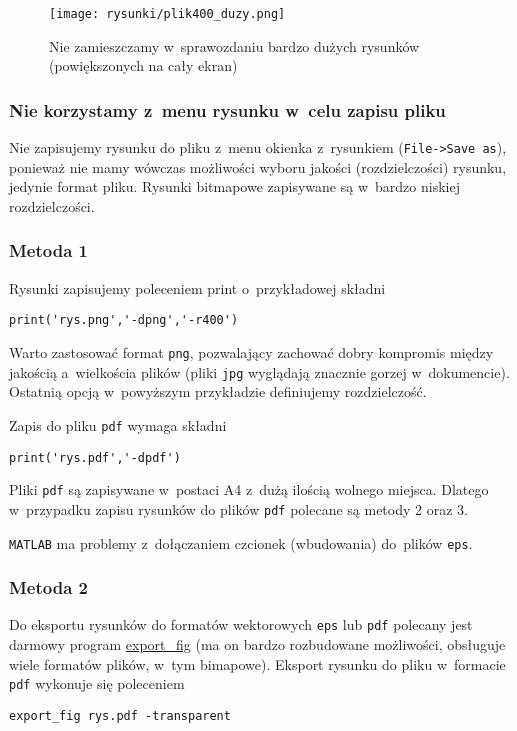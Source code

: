 \begin{figure}[H]
\centering
\texttt{[image: rysunki/plik400\_duzy.png]}
\caption{Nie zamieszczamy w~sprawozdaniu bardzo dużych rysunków (powiększonych na cały ekran)}
\label{r_plik400_duzy}
\end{figure}

\subsubsection{Nie korzystamy z~menu rysunku w~celu zapisu pliku}
Nie zapisujemy rysunku do pliku z~menu okienka z~rysunkiem (\texttt{File->Save as}), ponieważ nie mamy wówczas możliwości wyboru jakości (rozdzielczości) rysunku, jedynie format pliku. Rysunki bitmapowe zapisywane są w~bardzo niskiej rozdzielczości.

\subsubsection{Metoda 1}
Rysunki zapisujemy poleceniem print o~przykładowej składni
\begin{lstlisting}[style=custommatlab,frame=single]
print('rys.png','-dpng','-r400')
\end{lstlisting}
Warto zastosować format \texttt{png}, pozwalający zachować dobry kompromis między jakością a~wielkościa plików (pliki \texttt{jpg} wyglądają znacznie gorzej w~dokumencie). Ostatnią opcją w~powyższym przykładzie definiujemy rozdzielczość.

Zapis do pliku \texttt{pdf} wymaga składni
\begin{lstlisting}[style=custommatlab,frame=single]
print('rys.pdf','-dpdf')
\end{lstlisting}
Pliki \texttt{pdf} są zapisywane w~postaci A4 z~dużą ilością wolnego miejsca. Dlatego w~przypadku zapisu rysunków do plików \texttt{pdf} polecane są metody 2 oraz 3.

\texttt{MATLAB} ma problemy z~dołączaniem czcionek (wbudowania) do~plików \texttt{eps}.

\subsubsection{Metoda 2}
Do eksportu rysunków do formatów wektorowych \texttt{eps} lub \texttt{pdf} polecany jest darmowy program \url{export_fig} (ma on bardzo rozbudowane możliwości, obsługuje wiele formatów plików, w~tym bimapowe). Eksport rysunku do pliku w~formacie \texttt{pdf} wykonuje się poleceniem
\begin{lstlisting}[style=custommatlab,frame=single]
export_fig rys.pdf -transparent
\end{lstlisting}

